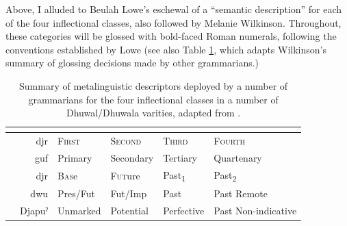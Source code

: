 Above, I alluded to Beulah Lowe's eschewal of a ``semantic description'' for each of the four inflectional classes, also followed by Melanie Wilkinson. Throughout, these categories will be glossed with bold-faced Roman numerals, following the conventions established by Lowe (see also Table \ref{Infl-Comparisons-Wilk}, which adapts Wilkinson's summary of glossing decisions made by other grammarians.)%


\begin{table}[h]
	\caption[Different glossing conventions for Dhuwal(a) inflectional categories]{Summary of metalinguistic descriptors deployed by a number of grammarians for the four inflectional classes in a number of Dhuwal/Dhuwala varities, adapted from \citet[336]{Wilkinson1991}.}\label{Infl-Comparisons-Wilk}\small
	\begin{tabular}{lr|llll}
		&&	\textbf{\I}	& \textbf{\II}	&	\textbf{\III}	&	\textbf{\IV}\\\midrule
		\citealt{Wilkinson1991}& \gls{djr} &\textsc{First}&\textsc{Second}&\textsc{Third}&\textsc{Fourth}\\
		\citealt{Lowe1996}\footnotemark &\gls{guf} &Primary&Secondary&Tertiary&Quartenary\\
		\citealt{Tchekhoff1983}& \gls{djr}&\textsc{Bas}e&\textsc{Fut}ure&Past\textsubscript1&Past\textsubscript2\\
		\citealt{Heath1980}& \gls{dwu} & Pres/Fut & Fut/Imp & Past & Past Remote\\
		\citealt{Morphy1983}\footnotemark& \footnotesize Djapuˀ & Unmarked & Potential & Perfective & Past Non-indicative\\
	\end{tabular}
	
\end{table}	

\addtocounter{footnote}{-1}

